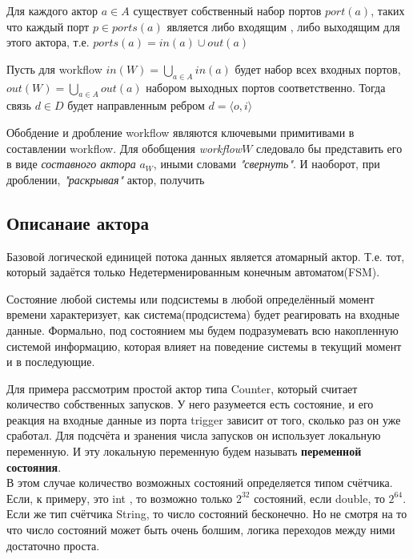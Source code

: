 \documentclass[a4paper,14pt]{article}
\newcommand{\workflow}{\textit{workflow}}
\newenvironment{definition}[1]{\begin{trivlist}
\item[\hskip \labelsep {\bfseries #1}]}{\end{trivlist}}
\begin{document}
\begin{definition}{Порты}
Для каждого актор $a \in A$ существует собственный набор портов $port(a)$, таких что каждый порт $p \in ports(a)$ является либо входящим , либо выходящим для этого актора, т.е. $ports(a) = in(a) \cup out(a)$

\end{definition}

\begin{definition}{Связи}
Пусть для workflow $in(W) = {\bigcup_{a \in A} in(a)}$ будет набор всех входных портов, $out(W) = {\bigcup_{a \in A} out(a)}$ набором выходных портов соответственно. Тогда связь $d \in D$ будет направленным ребром $d = \langle o,i \rangle$
\end{definition}

\begin{definition}{Обобщение и дробление \workflow}
Обобдение и дробление workflow являются ключевыми примитивами в составлении workflow. Для обобщения \workflow $W$ следовало бы представить его в виде \textit{составного актора} $a_{W}$, иными словами \textit{"свернуть"}. И наоборот, при дроблении, \textit{"раскрывая"} актор, получить 
\end{definition}


\subsection{Описанаие актора}
Базовой логической единицей потока данных является атомарный актор. Т.е. тот, который задаётся только Недетерменированным конечным автоматом(FSM). 
 
Состояние любой системы или подсистемы в любой определённый момент времени характеризует, как система(продсистема) будет реагировать на входные данные.
Формально, под состоянием мы будем подразумевать всю накопленную системой информацию, которая влияет на поведение системы в текущий момент и в последующие.

Для примера рассмотрим простой актор типа Counter, который считает количество собственных запусков. У него разумеется есть состояние, и его реакция на входные данные из порта trigger зависит от того, сколько раз он уже сработал. Для подсчёта и зранения числа запусков он использует локальную переменную. И эту локальную переменную будем называть \textbf{переменной состояния}.
\\ 
В этом случае количество возможных состояний определяется типом счётчика. Если, к примеру, это int , то возможно только $2^{32}$ состояний, если double, то $2^{64}$. Если же тип счётчика  String, то число состояний бесконечно. Но не смотря на то что число состояний может быть очень болшим, логика переходов между ними достаточно проста. 
\end{document}
